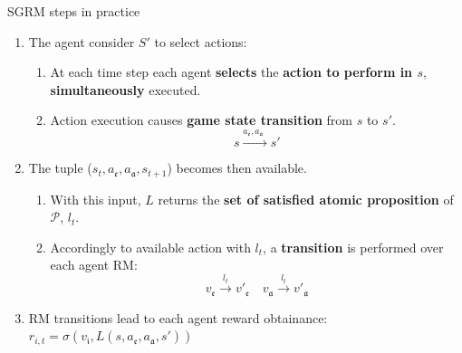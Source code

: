 \documentclass[10pt, aspectratio=169]{beamer}
\newcommand{\evidenzia}[1]{\textcolor{verdeSalvia}{\textbf{#1}}}
\begin{document}

\begin{frame}{SGRM steps in practice}

 \begin{enumerate}
 \item The agent consider $S'$ to select actions:
 \begin{enumerate}
    \item At each time step each agent \evidenzia{selects} the \evidenzia{action to perform in $s$}, \evidenzia{simultaneously} executed.
    \item Action execution causes \evidenzia{game state transition} from $s$ to $s'$. $$s\overset{a_\mathfrak{e},a_\mathfrak{a}\ \ }{\longrightarrow} s'$$
 \end{enumerate}
 \item The tuple ($s_t, a_\mathfrak{e},a_\mathfrak{a},s_{t+1}$) becomes then available.
 \begin{enumerate}
    \item With this input, $L$ returns the \evidenzia{set of satisfied atomic proposition} of $\mathcal{P}$, $l_t$.
    \item Accordingly to available action with $l_t$, a \evidenzia{transition} is performed over each agent RM: 
    $$v_\mathfrak{e}\overset{l_t}{\longrightarrow} v'_\mathfrak{e} \quad v_\mathfrak{a}\overset{l_t}{\longrightarrow} v'_\mathfrak{a}$$
\end{enumerate}

 \item RM transitions lead to each agent reward obtainance: $r_{i,t} = \sigma(v_\mathfrak{i}, L(s, a_\mathfrak{e}, a_\mathfrak{a}, s'))$
\end{enumerate}
\end{frame}
\end{document}

